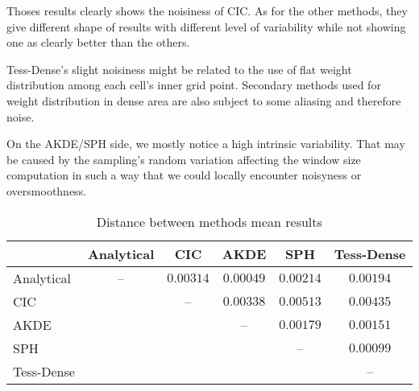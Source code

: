 \documentclass[10pt,a4paper,twoside,twocolumn]{article}
\newcommand*{\rootPath}{../}
\begin{document}
Thoses results clearly shows the noisiness of CIC. As for the other methods,
they give different shape of results with different level of variability while
not showing one as clearly better than the others.

Tess-Dense's slight noisiness might be related to the use of flat weight
distribution among each cell's inner grid point. Secondary methods used for
weight distribution in dense area are also subject to some aliasing and
therefore noise.

On the AKDE/SPH side, we mostly notice a high intrinsic variability. That may be
caused by the sampling's random variation affecting the window size computation
in such a way that we could locally encounter noisyness or oversmoothness.

\begin{table*}
	\centering
	\begin{tabular}{|l|c|c|c|c|c|}
		\hline
								& Analytical	& CIC				& AKDE			& SPH				& Tess-Dense\\
		\hline
		Analytical	& --					& $0.00314$	& $0.00049$	& $0.00214$	& $0.00194$	\\
		CIC					&							& --				& $0.00338$	& $0.00513$	& $0.00435$	\\
		AKDE				&							&						& --				& $0.00179$	& $0.00151$	\\
		SPH					&							&						& 					& --				& $0.00099$	\\
		Tess-Dense	&							&						& 					& 					& --				\\
		\hline
	\end{tabular}
	\caption{Distance between methods mean results}
\end{table*}

\ifstandalone
	
	
\fi
\end{document}
